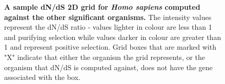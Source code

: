 \documentclass{article}
\begin{document}
\begin{figure}[]
\centering
{}
\caption{\textbf{A sample dN/dS 2D grid for \textit{Homo sapiens} computed against the other significant organisms.} The intensity values represent the dN/dS ratio - values lighter in colour are less than 1 and purifying selection while values darker in colour are greater than 1 and represent positive selection. Grid boxes that are marked with "X" indicate that either the organism the grid represents, or the organism that dN/dS is computed against, does not have the gene associated with the box.}
\label{fig_4}
\end{figure}
\end{document}
